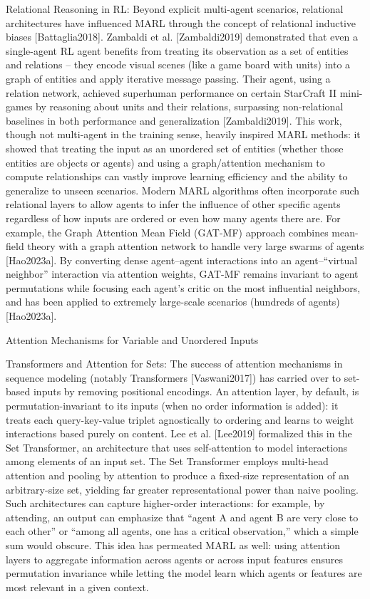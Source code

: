 \documentclass{article}
\begin{document}
Relational Reasoning in RL: Beyond explicit multi-agent scenarios, relational architectures have influenced MARL through the concept of relational inductive biases [Battaglia2018]. Zambaldi et al. [Zambaldi2019] demonstrated that even a single-agent RL agent benefits from treating its observation as a set of entities and relations – they encode visual scenes (like a game board with units) into a graph of entities and apply iterative message passing. Their agent, using a relation network, achieved superhuman performance on certain StarCraft II mini-games by reasoning about units and their relations, surpassing non-relational baselines in both performance and generalization [Zambaldi2019]. This work, though not multi-agent in the training sense, heavily inspired MARL methods: it showed that treating the input as an unordered set of entities (whether those entities are objects or agents) and using a graph/attention mechanism to compute relationships can vastly improve learning efficiency and the ability to generalize to unseen scenarios. Modern MARL algorithms often incorporate such relational layers to allow agents to infer the influence of other specific agents regardless of how inputs are ordered or even how many agents there are. For example, the Graph Attention Mean Field (GAT-MF) approach combines mean-field theory with a graph attention network to handle very large swarms of agents [Hao2023a]. By converting dense agent–agent interactions into an agent–“virtual neighbor” interaction via attention weights, GAT-MF remains invariant to agent permutations while focusing each agent’s critic on the most influential neighbors, and has been applied to extremely large-scale scenarios (hundreds of agents) [Hao2023a].

Attention Mechanisms for Variable and Unordered Inputs

Transformers and Attention for Sets: The success of attention mechanisms in sequence modeling (notably Transformers [Vaswani2017]) has carried over to set-based inputs by removing positional encodings. An attention layer, by default, is permutation-invariant to its inputs (when no order information is added): it treats each query-key-value triplet agnostically to ordering and learns to weight interactions based purely on content. Lee et al. [Lee2019] formalized this in the Set Transformer, an architecture that uses self-attention to model interactions among elements of an input set. The Set Transformer employs multi-head attention and pooling by attention to produce a fixed-size representation of an arbitrary-size set, yielding far greater representational power than naive pooling. Such architectures can capture higher-order interactions: for example, by attending, an output can emphasize that “agent A and agent B are very close to each other” or “among all agents, one has a critical observation,” which a simple sum would obscure. This idea has permeated MARL as well: using attention layers to aggregate information across agents or across input features ensures permutation invariance while letting the model learn which agents or features are most relevant in a given context.
\end{document}
